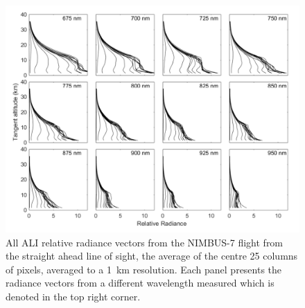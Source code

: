 \documentclass[12pt]{article}
\begin{document}
\begin{figure}
\includegraphics[width=1.0\textwidth]{./Images/5-2-AliRadianceVectors.pdf}
    \caption{All ALI relative radiance vectors from the NIMBUS-7 flight from the straight ahead line of sight, the average of the centre 25 columns of pixels, averaged to a 1~km resolution. Each panel presents the radiance vectors from a different wavelength measured which is denoted in the top right corner.}
    \label{fig:AliRadiancesVectors}
\end{figure}

\newpage
\end{document}
